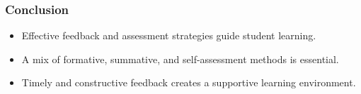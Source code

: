 \documentclass[aspectratio=169]{beamer}
\begin{document}
\begin{frame}[fragile]
    \frametitle{Conclusion}
    \begin{itemize}
        \item Effective feedback and assessment strategies guide student learning.
        \item A mix of formative, summative, and self-assessment methods is essential.
        \item Timely and constructive feedback creates a supportive learning environment.
    \end{itemize}
\end{frame}
\end{document}

